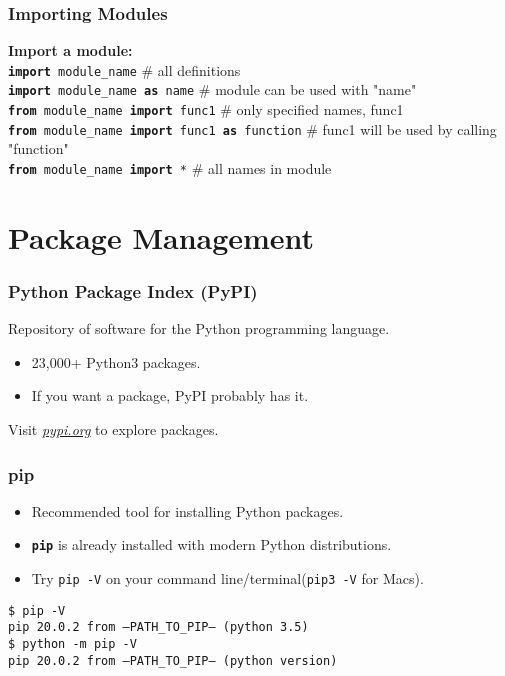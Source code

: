    \begin{frame}
        \frametitle{Importing Modules}
        \LARGE
        \pause
        \textbf{Import a module:}\\
        \pause
        \texttt{\textbf{import} module\_name}  \# all definitions \\
        \pause
        \texttt{\textbf{import} module\_name \textbf{as} name}  \# module can be used with "name" \\
         \pause
        \texttt{\textbf{from} module\_name \textbf{import} func1}  \# only specified names, func1 \\
        \pause
        \texttt{\textbf{from} module\_name \textbf{import} func1 \textbf{as} function}  \# func1 will be used by calling "function" \\
        \pause
        \texttt{\textbf{from} module\_name \textbf{import} *}  \# all names in module \\
    \end{frame}

    \section{Package Management}

    \begin{frame}
        \frametitle{Python Package Index (PyPI)}
        \pause
        \huge
        Repository of software for the Python programming language.
        \pause
        \begin{itemize}
            \item 23,000+ Python3 packages.
            \pause
            \item If you want a package, PyPI probably has it. 
        \end{itemize}
        \pause
        Visit \href{https://pypi.org/}{\underline{\textit{pypi.org}}} to explore packages.
    \end{frame}

    \begin{frame}
        \frametitle{pip}
        \LARGE
        \pause
        \begin{itemize}
        \item Recommended tool for installing Python packages.
        \pause
        \item \textbf{\texttt{pip}} is already installed with modern Python distributions.
        \pause
        \item Try \texttt{pip -V} on your command line/terminal(\texttt{pip3 -V} for Macs). 
        \end{itemize}
        \pause
        \texttt{\$ pip -V}\\
        \texttt{pip 20.0.2 from --PATH\_TO\_PIP-- (python 3.5)}\\
        \pause
        \texttt{\$ python -m pip -V}\\
        \texttt{pip 20.0.2 from --PATH\_TO\_PIP-- (python version)}\\
    \end{frame}

